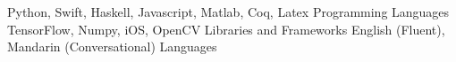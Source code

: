 \begin{cventries}
  \cvsmallentry
    {Python, Swift, Haskell, Javascript, Matlab, Coq, Latex}
    {Programming Languages}
    {}
    {}
    {}
  \cvsmallentry
    {TensorFlow, Numpy, iOS, OpenCV}
    {Libraries and Frameworks}
    {}
    {}
    {}
  \cvsmallentry
    {English (Fluent), Mandarin (Conversational)}
    {Languages}
    {}
    {}
    {}
\end{cventries}


